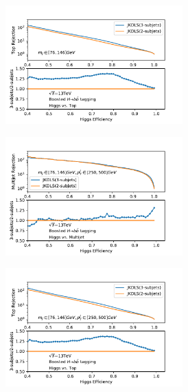 \begin{figure}[htbp]
\begin{subfigure}{.5\textwidth}
     \caption{}
  \end{subfigure}
  \begin{subfigure}{.5\textwidth}
  \centering
   \includegraphics[width=0.75\textwidth]{figuresXbb/Subjet/SUBTopMASS.pdf}
     \caption{}
  \end{subfigure}
 \newline 
   \begin{subfigure}{.5\textwidth}
  \centering
   \includegraphics[width=0.75\textwidth]{figuresXbb/Subjet/SUBQCDMASSPT1.pdf}
     \caption{}
  \end{subfigure}
  \begin{subfigure}{.5\textwidth}
  \centering
   \includegraphics[width=0.75\textwidth]{figuresXbb/Subjet/SUBTopMASSPT1.pdf}

\end{subfigure}
\end{figure}
